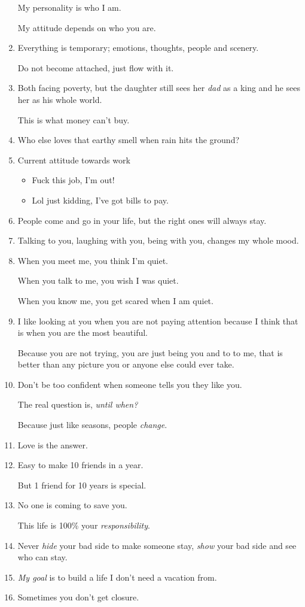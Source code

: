 \documentclass{article}
\begin{document}
\begin{enumerate}
	My personality is who I am.
	
	My attitude depends on who you are.
	\item Everything is temporary; emotions, thoughts, people and scenery.
	
	Do not become attached, just flow with it.
	\item Both facing poverty, but the daughter still sees her \textit{dad} as a king and he sees her as his whole world.
	
	This is what money can't buy.
	\item Who else loves that earthy smell when rain hits the ground?
	\item Current attitude towards work
	\begin{itemize}
		\item Fuck this job, I'm out!
		\item Lol just kidding, I've got bills to pay.
	\end{itemize}
	\item People come and go in your life, but the right ones will always stay.
	\item Talking to you, laughing with you, being with you, changes my whole mood.
	\item When you meet me, you think I'm quiet.
	
	When you talk to me, you wish I was quiet.
	
	When you know me, you get scared when I am quiet.
	\item I like looking at you when you are not paying attention because I think that is when you are the most beautiful.
	
	Because you are not trying, you are just being you and to to me, that is better than any picture you or anyone else could ever take.
	\item Don't be too confident when someone tells you they like you.
	
	The real question is, \textit{until when?}
	
	Because just like seasons, people \textit{change}.
	\item Love is the answer.
	\item Easy to make 10 friends in a year.
	
	But 1 friend for 10 years is special.
	\item No one is coming to save you.
	
	This life is 100\% your \textit{responsibility}.
	\item Never \textit{hide} your bad side to make someone stay, \textit{show} your bad side and see who can stay.
	\item \textit{My goal} is to build a life I don't need a vacation from.
	\item Sometimes you don't get closure.
	

\end{enumerate}
\end{document}
